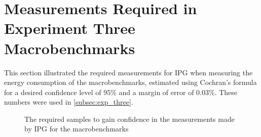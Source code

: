 \section{Measurements Required in Experiment Three Macrobenchmarks}\label{app:exp_three_coch_app}

This section illustrated the required measurements for IPG when measuring the energy consumption of the macrobenchmarks, estimated using Cochran's formula for a desired confidence level of 95\% and a margin of error of 0.03\%. These numbers were used in \cref{subsec:exp_three}.


\begin{figure}[H]
    \centering
    \begin{subfigure}[b]{0.4\textwidth}
        \centering
        
    \end{subfigure}
    \hfill
    \begin{subfigure}[b]{0.4\textwidth}
        \centering
        
    \end{subfigure}
    \caption{The required samples to gain confidence in the measurements made by IPG for the macrobenchmarks}
\end{figure}